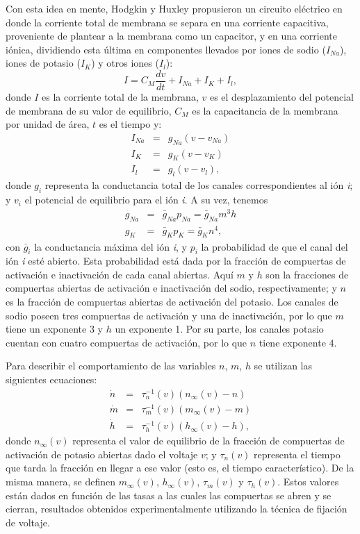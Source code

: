 \documentclass[aps,twocolumn,groupedaddress]{revtex4-2}
\begin{document}
Con esta idea en mente, Hodgkin y Huxley propusieron un circuito eléctrico en donde la corriente total de membrana se separa en una corriente capacitiva, proveniente de plantear a la membrana como un capacitor, y en una corriente iónica, dividiendo esta última en componentes llevados por iones de sodio (\(I_{Na}\)), iones de potasio (\(I_K\)) y otros iones (\(I_l\)):
\begin{equation}
I = C_M \frac{dv}{dt} + I_{Na} + I_K + I_l \label{eq:I_inicial},
\end{equation}
donde $I$ es la corriente total de la membrana, $v$ es el desplazamiento del potencial de membrana de su valor de equilibrio, $C_M$ es la capacitancia de la membrana por unidad de área, $t$ es el tiempo y:
\begin{eqnarray}
I_{Na} &=& g_{Na}(v-v_{Na})\\
I_K &=& g_K(v-v_K)\\
I_l &=& g_l(v-v_l),
\end{eqnarray}
donde \(g_i\) representa la conductancia total de los canales correspondientes al ión \textit{i}; y \(v_i\) el potencial de equilibrio para el ión \textit{i}. A su vez, tenemos 
\begin{eqnarray}
g_{Na} &=& \bar{g}_{Na}p_{Na} = \bar{g}_{Na}m^3h\\
g_K &=& \bar{g}_{K}p_{K} = \bar{g}_Kn^4,
\end{eqnarray}
con \(\bar{g}_i\) la conductancia máxima del ión \textit{i}, y \(p_i\) la probabilidad de que el canal del ión \textit{i} esté abierto. Esta probabilidad está dada por la fracción de compuertas de activación e inactivación de cada canal abiertas. Aquí $m$ y $h$ son la fracciones de compuertas abiertas de activación e inactivación del sodio, respectivamente; y $n$ es la fracción de compuertas abiertas de activación del potasio.
Los canales de sodio poseen tres compuertas de activación y una de inactivación, por lo que $m$ tiene un exponente 3 y $h$ un exponente 1. Por su parte, los canales potasio cuentan con cuatro compuertas de activación, por lo que $n$ tiene exponente 4.

Para describir el comportamiento de las variables \(n\), \(m\), \(h\) se utilizan las siguientes ecuaciones:
\begin{eqnarray}
\dot{n}&=&\tau_n^{-1}(v)(n_{\infty}(v)-n) \label{eq:ODEn}\\
\dot{m}&=&\tau_m^{-1}(v)(m_{\infty}(v)-m) \label{eq:ODEm}\\
\dot{h}&=&\tau_h^{-1}(v)(h_{\infty}(v)-h), \label{eq:ODEh}
\end{eqnarray}
donde \(n_{\infty}(v)\) representa el valor de equilibrio de la fracción de compuertas de activación de potasio abiertas dado el voltaje \(v\); y \(\tau_n(v)\) representa el tiempo que tarda la fracción en llegar a ese valor (esto es, el tiempo característico). De la misma manera, se definen \(m_{\infty}(v)\), \(h_{\infty}(v)\), \(\tau_m(v)\) y \(\tau_h(v)\). Estos valores están dados en función de las tasas a las cuales las compuertas se abren y se cierran, resultados obtenidos experimentalmente utilizando la técnica de fijación de voltaje.
\end{document}
